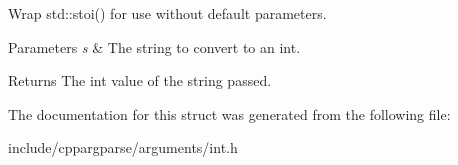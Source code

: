 Wrap std\+::stoi() for use without default parameters. 


\begin{DoxyParams}{Parameters}
{\em s} & The string to convert to an int.\\
\hline
\end{DoxyParams}
\begin{DoxyReturn}{Returns}
The int value of the string passed. 
\end{DoxyReturn}


The documentation for this struct was generated from the following file\+:\begin{DoxyCompactItemize}
\item 
include/cppargparse/arguments/int.\+h\end{DoxyCompactItemize}
